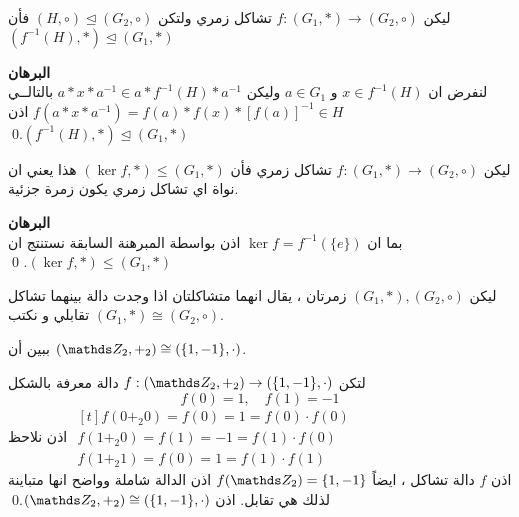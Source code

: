  \begin{theorem}
 ليكن $f : (G_1, *) \to (G_2, \circ)$ تشاكل زمري ولتكن 
 $(H, \circ) \trianglelefteq (G_2, \circ)$
 فأن 
 $(f^{-1}(H), *) \trianglelefteq (G_1, *)$
 \end{theorem}
\noindent
\textbf{البرهان}\\
\noindent
لنفرض ان $x \in f^{-1}(H)$ و $a\in G_1$ وليكن 
$a * x * a^{-1} \in a * f^{-1}(H) *a^{-1}$ بالتالــي
$f(a * x * a^{-1}) = f(a) * f(x) * [f(a)]^{-1} \in H$ اذن $(f^{-1}(H), *) \trianglelefteq (G_1, *)$.\qed
\newpage
\begin{corollary}
ليكن $f : (G_1, *) \to (G_2, \circ)$ تشاكل زمري فأن 
$(\ker f, *) \leq (G_1, *)$ 
هذا يعني ان نواة اي تشاكل زمري يكون زمرة جزئية.
\end{corollary}
\noindent
\textbf{البرهان}\\
\noindent
بما ان
$\ker f = f^{-1}(\{e\})$
اذن بواسطة المبرهنة السابقة نستنتج ان 
$(\ker f, *) \leq (G_1, *)$. \qed 

\begin{definition}
	ليكن 
	$(G_1, *) , (G_2, \circ)$ زمرتان ، يقال انهما متشاكلتان اذا وجدت دالة بينهما تشاكل تقابلي و نكتب $(G_1, *) \cong (G_2, \circ)$.
\end{definition}

\begin{example}
	ببين أن 
	$(\Z_2, +_2) \cong (\{1,-1\}, \cdot)$.
\end{example}
\begin{solution}
	لتكن 
	$f  : (\Z_2, +_2) \to (\{1,-1\}, \cdot)$  دالة معرفة بالشكل
	\[
	f(0) = 1, \quad f(1) = -1
	\]
	اذن نلاحظ
	$
	\begin{gathered}[t]
		f(0 +_2 0) = f(0) = 1 = f(0)\cdot f(0)\\
		f(1+_2 0) = f(1) = -1 = f(1) \cdot f(0)\\
		f(1 +_2 1) = f(0) = 1 = f(1) \cdot f(1)
	\end{gathered}
	$\\
	اذن $f$ دالة تشاكل ، ايضاً $f(\Z_2) = \{1,-1\}$ اذن الدالة شاملة وواضح انها متباينة لذلك هي تقابل. اذن 	$(\Z_2, +_2) \cong (\{1,-1\}, \cdot)$.\qed
\end{solution}
